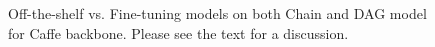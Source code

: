 \documentclass[10pt,twocolumn,letterpaper]{article}
\begin{document}
\begin{figure}[t]
\centering
	
\caption{Off-the-shelf vs. Fine-tuning models on both Chain and DAG model for Caffe backbone. Please see the text for a discussion.}
\label{fig:comp_otf}
\end{figure}
\end{document}
